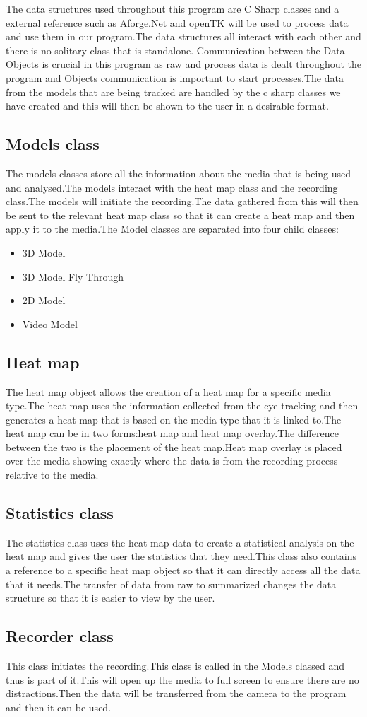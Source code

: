 The data structures used throughout this program are C Sharp classes and a external reference such as Aforge.Net and openTK will be used to process data and use them in our program.The data structures all interact with each other and there is no solitary class that is standalone. Communication between the Data Objects is crucial in this program as raw and process data is dealt throughout the program and Objects communication is important to start processes.The data from the models that are being tracked are handled by the c sharp classes we have created and this will then be shown to the user in a desirable format.

\subsection{Models class}
The models classes store all the information about the media that is being used and analysed.The models interact with the heat map class and the recording class.The models will initiate the recording.The data gathered from this will then be sent to the relevant heat map class so that it can create a heat map and then apply it to the media.The Model classes are separated into four child classes:
\begin{itemize}
\item 3D Model
\item 3D Model Fly Through
\item 2D Model
\item Video Model
\end{itemize}
\subsection{Heat map}
The heat map object allows the creation of a heat map for a specific media type.The heat map uses the information collected from the eye tracking and then generates a heat map that is based on the media type that it is linked to.The heat map can be in two forms:heat map and heat map overlay.The difference between the two is the placement of the heat map.Heat map overlay is placed over the media showing exactly where the data is from the recording process relative to the media.
\subsection{Statistics class}
The statistics class uses the heat map data to create a statistical analysis on the heat map and gives the user the statistics that they need.This class also contains a reference to a specific heat map object so that it can directly access all the data that it needs.The transfer of data from raw to summarized changes the data structure so that it is easier to view by the user.
\subsection{Recorder class}
This class initiates the recording.This class is called in the Models classed and thus is part of it.This will open up the media to full screen to ensure there are no distractions.Then the data will be transferred from the camera to the program and then it can be used.
